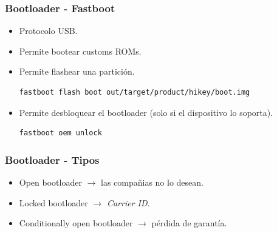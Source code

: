 \begin{frame}[fragile]
  \frametitle{Bootloader - Fastboot}
  \begin{itemize}
      \item Protocolo USB.
      
      \item Permite bootear customs ROMs.
      
      \item Permite flashear una partición.
    \begin{lstlisting}
fastboot flash boot out/target/product/hikey/boot.img
    \end{lstlisting}
      
      \item Permite desbloquear el bootloader (solo si el dispositivo lo soporta).
    \begin{lstlisting}
fastboot oem unlock
    \end{lstlisting}

  \end{itemize}
\end{frame}

\begin{frame}
  \frametitle{Bootloader - Tipos}
  \begin{itemize}
      \item Open bootloader $\rightarrow$ las compañias no lo desean.
      
      \item Locked bootloader $\rightarrow$ \textit{Carrier ID}.
      
      \item Conditionally open bootloader $\rightarrow$ pérdida de garantía.      
  \end{itemize}
\end{frame}

